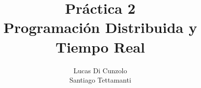 \documentclass[12pt,journal,compsoc]{IEEEtran}
\begin{document}
\title{Práctica 2\\Programación Distribuida y Tiempo Real}
%
%
%
%

\author{Lucas Di Cunzolo\\Santiago Tettamanti}
% 
%


% 
\end{document}
